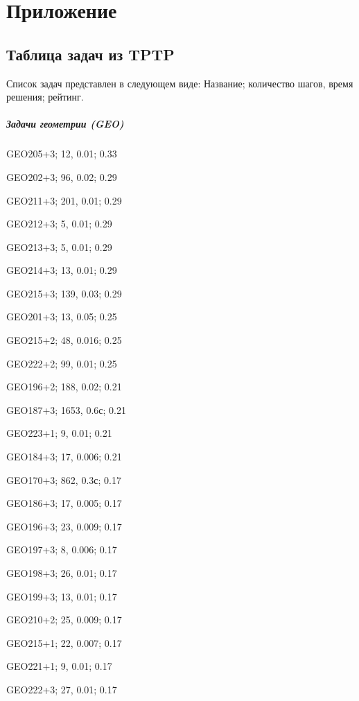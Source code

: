 \chapter*{Приложение}




\section*{Таблица задач из TPTP}
Список задач представлен в следующем виде: Название; количество шагов, время решения; рейтинг.

\paragraph{Задачи геометрии (GEO)}

GEO205+3; 12, 0.01; 0.33

GEO202+3; 96, 0.02; 0.29

GEO211+3; 201, 0.01; 0.29

GEO212+3; 5, 0.01; 0.29

GEO213+3; 5, 0.01; 0.29

GEO214+3; 13, 0.01; 0.29

GEO215+3; 139, 0.03; 0.29

GEO201+3; 13, 0.05; 0.25

GEO215+2; 48, 0.016; 0.25

GEO222+2; 99, 0.01; 0.25

GEO196+2; 188, 0.02; 0.21

GEO187+3; 1653, 0.6с; 0.21

GEO223+1; 9, 0.01; 0.21

GEO184+3; 17, 0.006; 0.21

GEO170+3; 862, 0.3с; 0.17

GEO186+3; 17, 0.005; 0.17

GEO196+3; 23, 0.009; 0.17

GEO197+3; 8, 0.006; 0.17

GEO198+3; 26, 0.01; 0.17

GEO199+3; 13, 0.01; 0.17

GEO210+2; 25, 0.009; 0.17

GEO215+1; 22, 0.007; 0.17

GEO221+1; 9, 0.01; 0.17

GEO222+3; 27, 0.01; 0.17

